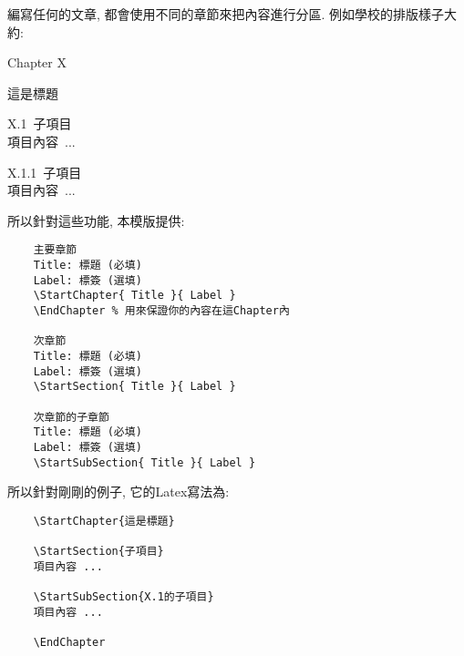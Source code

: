 

編寫任何的文章, 都會使用不同的章節來把內容進行分區. 例如學校的排版樣子大約:

\begin{framed}
  \centerline{\LARGE Chapter X}
  \vspace{0.2cm}
  \centerline{\LARGE 這是標題}

  \vspace{0.5cm}
  \mbox{\Large X.1 子項目}\\
  \mbox{\hspace{1.2cm}項目內容 ...}

  \vspace{0.3cm}
  \mbox{\large X.1.1 子項目}\\
  \mbox{\hspace{1.2cm}項目內容 ...}
\end{framed}

所以針對這些功能, 本模版提供:

\begin{framed}
  \begin{verbatim}
    主要章節
    Title: 標題 (必填)
    Label: 標簽 (選填)
    \StartChapter{ Title }{ Label }
    \EndChapter % 用來保證你的內容在這Chapter內

    次章節
    Title: 標題 (必填)
    Label: 標簽 (選填)
    \StartSection{ Title }{ Label }

    次章節的子章節
    Title: 標題 (必填)
    Label: 標簽 (選填)
    \StartSubSection{ Title }{ Label }
  \end{verbatim}
\end{framed}

所以針對剛剛的例子, 它的Latex寫法為:

\begin{framed}
  \begin{verbatim}
    \StartChapter{這是標題}

    \StartSection{子項目}
    項目內容 ...

    \StartSubSection{X.1的子項目}
    項目內容 ...

    \EndChapter
  \end{verbatim}
\end{framed}

